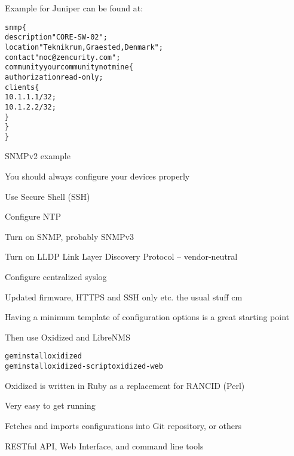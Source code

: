 \documentclass[Screen16to9,17pt]{foils}
\begin{document}
Example for Juniper can be found at:\\
{\small{}}




\begin{alltt}
snmp \{
    description "CORE-SW-02";
    location "Teknikrum, Graested, Denmark";
    contact "noc@zencurity.com";
    community yourcommunitynotmine \{
        authorization read-only;
        clients \{
            10.1.1.1/32;
            10.1.2.2/32;
        \}
    \}
\}
\end{alltt}

SNMPv2 example







\begin{slidelist}
\item You should always configure your devices properly
\item Use Secure Shell (SSH)
\item Configure NTP
\item Turn on SNMP, probably SNMPv3
\item Turn on LLDP Link Layer Discovery Protocol -- vendor-neutral\\
{\small{}}
\item Configure centralized syslog
\item Updated firmware, HTTPS and SSH only etc. the usual stuff
 cm
\item Having a minimum template of configuration options is a great starting point
\end{slidelist}

Then use Oxidized and LibreNMS




\begin{alltt}
  gem install oxidized
  gem install oxidized-script oxidized-web
\end{alltt}

\begin{list2}
\item Oxidized is written in Ruby as a replacement for RANCID (Perl)
\item Very easy to get running
\item Fetches and imports configurations into Git repository, or others
\item RESTful API, Web Interface, and command line tools
\item {}
\end{list2}
\end{document}
